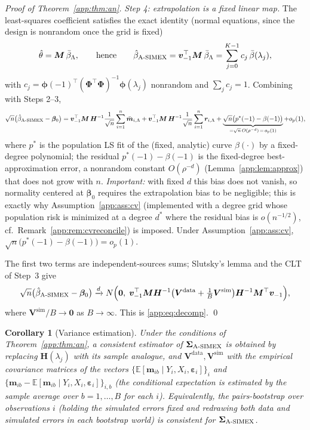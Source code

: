 \documentclass[11pt]{article}
\theoremstyle{plain}
\newtheorem{corollary}{Corollary}
\theoremstyle{definition}
\newcommand{\E}{\mathbb{E}}
\newcommand{\bet}{\bm{\beta}}
\newcommand{\beps}{\bm{\varepsilon}}
\newcommand{\bSig}{\bm{\Sigma}}
\newcommand{\bPhi}{\bm{\Phi}}
\newcommand{\bphi}{\bm{\phi}}
\newcommand{\btH}{\bm{H}}
\newcommand{\btV}{\bm{V}}
\newcommand{\asimex}{\textup{A-SIMEX}}
\begin{document}
\begin{proof}[Proof of Theorem~\ref{app:thm:an}]
\emph{Step 4: extrapolation is a fixed linear map.} The least-squares
coefficient satisfies the exact identity (normal equations, since the
design is nonrandom once the grid is fixed)
\[
  \hat\theta=\bm M\,\bar\beta_\Lambda,
  \qquad\text{hence}\qquad
  \hat\beta_{\asimex}
  =\bm v_{-1}^\top\bm M\,\bar\beta_\Lambda
  =\sum_{j=0}^{K-1}c_j\,\bar\beta(\lambda_j),
\]
with $c_j=\bphi(-1)^\top(\bPhi^\top\bPhi)^{-1}\bphi(\lambda_j)$
nonrandom and $\sum_jc_j=1$. Combining with Steps 2--3,
\[
  \sqrt n\bigl(\hat\beta_{\asimex}-\bet_0\bigr)
  =\bm v_{-1}^\top\bm M\,\btH^{-1}
   \frac{1}{\sqrt n}\sum_{i=1}^n\bar{\bm m}_{i,\Lambda}
  +\bm v_{-1}^\top\bm M\,\btH^{-1}
   \frac{1}{\sqrt n}\sum_{i=1}^n\bm r_{i,\Lambda}
  +\underbrace{\sqrt n\bigl(p^*(-1)-\beta(-1)\bigr)}
   _{=\sqrt n\,O(\rho^{-d})\,=\,o_p(1)}
  +o_p(1),
\]
where $p^*$ is the population LS fit of the (fixed, analytic) curve
$\beta(\cdot)$ by a fixed-degree polynomial; the residual
$p^*(-1)-\beta(-1)$ is the fixed-degree best-approximation error, a
nonrandom constant $O(\rho^{-d})$ (Lemma~\ref{app:lem:approx}) that does not
grow with $n$. \emph{Important:} with fixed $d$ this bias does not
vanish, so normality centered at $\bet_0$ requires the extrapolation
bias to be negligible; this is exactly why Assumption~\ref{app:ass:cv}
(implemented with a degree grid whose population risk is minimized at a
degree $d^*$ where the residual bias is $o(n^{-1/2})$, cf.\
Remark~\ref{app:rem:cvreconcile}) is imposed. Under Assumption~\ref{app:ass:cv},
$\sqrt n\bigl(p^*(-1)-\beta(-1)\bigr)=o_p(1)$.

The first two terms are independent-sources sums; Slutsky's lemma and the
CLT of Step~3 give
\[
  \sqrt n\bigl(\hat\beta_{\asimex}-\bet_0\bigr)
  \xrightarrow{d} N\Bigl(\bm 0,\;
  \bm v_{-1}^\top\bm M\btH^{-1}
  \bigl(\btV^{\mathrm{data}}+\tfrac1B\btV^{\mathrm{sim}}\bigr)
  \btH^{-1}\bm M^\top\bm v_{-1}\Bigr),
\]
where $\btV^{\mathrm{sim}}/B\to\bm 0$ as $B\to\infty$. This is
\eqref{app:eq:decomp}. \qed
\end{proof}

\begin{corollary}[Variance estimation]\label{app:cor:var}
Under the conditions of Theorem~\ref{app:thm:an}, a consistent estimator of
$\bSig_{\asimex}$ is obtained by replacing
$\bm H(\lambda_j)$ with its sample analogue, and
$\btV^{\mathrm{data}},\btV^{\mathrm{sim}}$ with the empirical covariance
matrices of the vectors
$\{\E[\bm m_{ib}\mid Y_i,X_i,\beps_i]\}_i$ and
$\{\bm m_{ib}-\E[\bm m_{ib}\mid Y_i,X_i,\beps_i]\}_{i,b}$
(the conditional expectation is estimated by the sample average over
$b=1,\dots,B$ for each $i$). Equivalently, the pairs-bootstrap over
observations $i$ (holding the simulated errors fixed and redrawing both
data and simulated errors in each bootstrap world) is consistent for
$\bSig_{\asimex}$.
\end{corollary}
\end{document}
